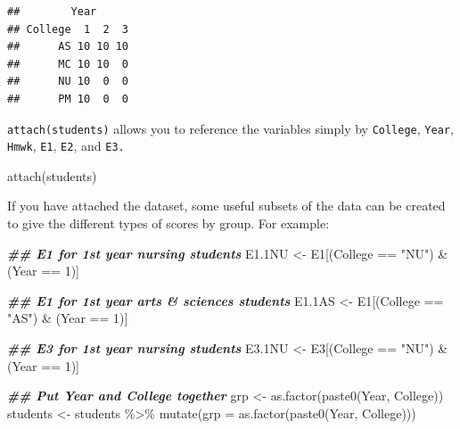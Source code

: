 \documentclass[
]{book}
\newenvironment{Shaded}{\begin{snugshade}}{\end{snugshade}}
\newcommand{\AttributeTok}[1]{\textcolor[rgb]{0.77,0.63,0.00}{#1}}
\newcommand{\DecValTok}[1]{\textcolor[rgb]{0.00,0.00,0.81}{#1}}
\newcommand{\DocumentationTok}[1]{\textcolor[rgb]{0.56,0.35,0.01}{\textbf{\textit{#1}}}}
\newcommand{\FloatTok}[1]{\textcolor[rgb]{0.00,0.00,0.81}{#1}}
\newcommand{\FunctionTok}[1]{\textcolor[rgb]{0.00,0.00,0.00}{#1}}
\newcommand{\NormalTok}[1]{#1}
\newcommand{\OtherTok}[1]{\textcolor[rgb]{0.56,0.35,0.01}{#1}}
\newcommand{\SpecialCharTok}[1]{\textcolor[rgb]{0.00,0.00,0.00}{#1}}
\newcommand{\StringTok}[1]{\textcolor[rgb]{0.31,0.60,0.02}{#1}}
\begin{document}
\begin{verbatim}
##        Year
## College  1  2  3
##      AS 10 10 10
##      MC 10 10  0
##      NU 10  0  0
##      PM 10  0  0
\end{verbatim}

\texttt{attach(students)} allows you to reference the variables simply by \texttt{College}, \texttt{Year}, \texttt{Hmwk}, \texttt{E1}, \texttt{E2}, and \texttt{E3.}

\begin{Shaded}
\begin{Highlighting}[]
\FunctionTok{attach}\NormalTok{(students)}
\end{Highlighting}
\end{Shaded}

If you have attached the dataset, some useful subsets of the data can be created to give the different types of scores by group. For example:

\begin{Shaded}
\begin{Highlighting}[]
\DocumentationTok{\#\# E1 for 1st year nursing students}
\NormalTok{E1}\FloatTok{.1}\NormalTok{NU }\OtherTok{\textless{}{-}}\NormalTok{ E1[(College }\SpecialCharTok{==} \StringTok{"NU"}\NormalTok{) }\SpecialCharTok{\&}\NormalTok{ (Year }\SpecialCharTok{==} \DecValTok{1}\NormalTok{)]}

\DocumentationTok{\#\# E1 for 1st year arts \& sciences students}
\NormalTok{E1}\FloatTok{.1}\NormalTok{AS }\OtherTok{\textless{}{-}}\NormalTok{ E1[(College }\SpecialCharTok{==} \StringTok{"AS"}\NormalTok{) }\SpecialCharTok{\&}\NormalTok{ (Year }\SpecialCharTok{==} \DecValTok{1}\NormalTok{)]}

\DocumentationTok{\#\# E3 for 1st year nursing students}
\NormalTok{E3}\FloatTok{.1}\NormalTok{NU }\OtherTok{\textless{}{-}}\NormalTok{ E3[(College }\SpecialCharTok{==} \StringTok{"NU"}\NormalTok{) }\SpecialCharTok{\&}\NormalTok{ (Year }\SpecialCharTok{==} \DecValTok{1}\NormalTok{)]}

\DocumentationTok{\#\# Put Year and College together}
\NormalTok{grp }\OtherTok{\textless{}{-}} \FunctionTok{as.factor}\NormalTok{(}\FunctionTok{paste0}\NormalTok{(Year, College))}
\NormalTok{students }\OtherTok{\textless{}{-}}\NormalTok{ students }\SpecialCharTok{\%\textgreater{}\%} 
  \FunctionTok{mutate}\NormalTok{(}\AttributeTok{grp =} \FunctionTok{as.factor}\NormalTok{(}\FunctionTok{paste0}\NormalTok{(Year, College)))}
\end{Highlighting}
\end{Shaded}
\end{document}
